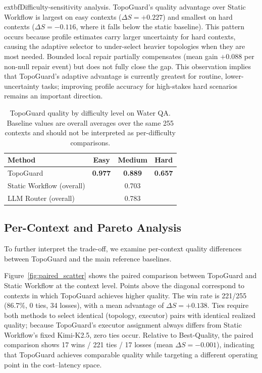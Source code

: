 \documentclass[manuscript,review,anonymous]{acmart}
\begin{document}
	extbf{Difficulty-sensitivity analysis.} TopoGuard's quality advantage over Static Workflow is largest on easy contexts ($\Delta S=+0.227$) and smallest on hard contexts ($\Delta S=-0.116$, where it falls below the static baseline). This pattern occurs because profile estimates carry larger uncertainty for hard contexts, causing the adaptive selector to under-select heavier topologies when they are most needed. Bounded local repair partially compensates (mean gain $+0.088$ per non-null repair event) but does not fully close the gap. This observation implies that TopoGuard's adaptive advantage is currently greatest for routine, lower-uncertainty tasks; improving profile accuracy for high-stakes hard scenarios remains an important direction.

\begin{table}[t]
\centering
\caption{TopoGuard quality by difficulty level on Water QA. Baseline values are overall averages over the same 255 contexts and should not be interpreted as per-difficulty comparisons.}
\label{tab:difficulty_breakdown}
\small
\begin{tabular}{lccc}
\toprule
\textbf{Method} & \textbf{Easy} & \textbf{Medium} & \textbf{Hard} \\
\midrule
TopoGuard        & \textbf{0.977} & \textbf{0.889} & \textbf{0.657} \\
Static Workflow (overall) & \multicolumn{3}{c}{0.703} \\
LLM Router (overall)       & \multicolumn{3}{c}{0.783} \\
\bottomrule
\end{tabular}
\end{table}




\subsection{Per-Context and Pareto Analysis}
\label{subsec:pareto_analysis}

To further interpret the trade-off, we examine per-context quality differences between TopoGuard and the main reference baselines.

Figure~\ref{fig:paired_scatter} shows the paired comparison between TopoGuard and Static Workflow at the context level. Points above the diagonal correspond to contexts in which TopoGuard achieves higher quality. The win rate is 221/255 (86.7\%, 0 ties, 34 losses), with a mean advantage of $\Delta S = +0.138$. Ties require both methods to select identical (topology, executor) pairs with identical realized quality; because TopoGuard's executor assignment always differs from Static Workflow's fixed Kimi-K2.5, zero ties occur. Relative to Best-Quality, the paired comparison shows 17 wins / 221 ties / 17 losses (mean $\Delta S = -0.001$), indicating that TopoGuard achieves comparable quality while targeting a different operating point in the cost--latency space.
\end{document}

